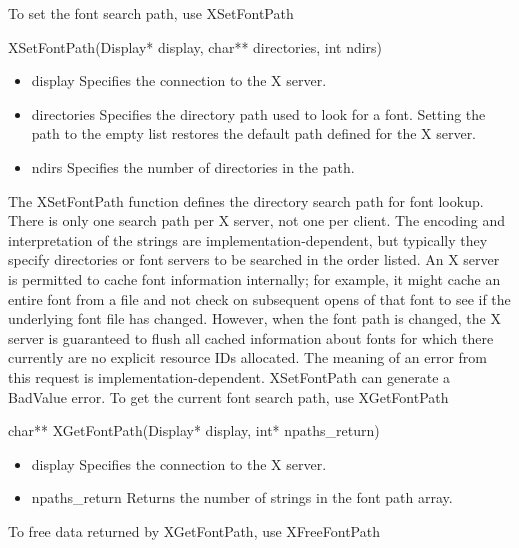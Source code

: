 \documentclass{report}
\begin{document}
\begin{itemize}
            \bigbreak \noindent 
            To set the font search path, use XSetFontPath
            \bigbreak \noindent 
            \begin{cppcode}
            XSetFontPath(Display* display, char** directories, int ndirs)
            \end{cppcode}
            \begin{itemize}
                \item display Specifies the connection to the X server.
                \item directories Specifies the directory path used to look for a font. Setting the path to the empty list restores the default path defined for the X server.
                \item ndirs Specifies the number of directories in the path.
            \end{itemize}
            The XSetFontPath function defines the directory search path for font lookup. There is only one search path per X server, not one per client. The encoding and interpretation of the strings are implementation-dependent, but typically they specify directories or font servers to be searched in the order listed. An X server is permitted to cache font information internally; for example, it might cache an entire font from a file and not check on subsequent opens of that font to see if the underlying font file has changed. However, when the font path is changed, the X server is guaranteed to flush all cached information about fonts for which there currently are no explicit resource IDs allocated. The meaning of an error from this request is implementation-dependent.
            \bigbreak \noindent 
            XSetFontPath can generate a BadValue error.
            \bigbreak \noindent 
            To get the current font search path, use XGetFontPath
            \bigbreak \noindent 
            \begin{cppcode}
            char** XGetFontPath(Display* display, int* npaths_return)
            \end{cppcode}
            \begin{itemize}
                \item display Specifies the connection to the X server.
                \item npaths\_return Returns the number of strings in the font path array.
            \end{itemize}
            To free data returned by XGetFontPath, use XFreeFontPath
            \bigbreak \noindent 
            \begin{cppcode}

\end{cppcode}
\end{itemize}
\end{document}
